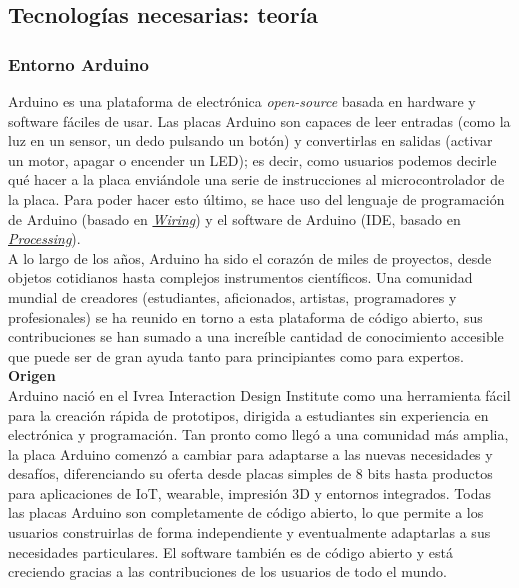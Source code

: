 \documentclass[12pt]{article}
\begin{document}
	
	\subsection[Tecnologías necesarias]{Tecnologías necesarias: teoría}
	\subsubsection[Entorno Arduino]{Entorno Arduino}
	
	
	Arduino es una plataforma de electrónica \textit{open-source} basada en hardware y software fáciles de usar. Las placas Arduino son capaces de leer entradas (como la luz en un sensor, un dedo pulsando un botón) y convertirlas en salidas (activar un motor, apagar o encender un LED); es decir, como usuarios podemos decirle qué hacer a la placa enviándole una serie de instrucciones al microcontrolador de la placa. Para poder hacer esto último, se hace uso del lenguaje de programación de Arduino (basado en \href{http://wiring.org.co/}{\textit{Wiring}}) y el software de Arduino (IDE, basado en \href{https://processing.org/}{\textit{Processing}}). \\
	
	\noindent A lo largo de los años, Arduino ha sido el corazón de miles de proyectos, desde objetos cotidianos hasta complejos instrumentos científicos. Una comunidad mundial de creadores (estudiantes, aficionados, artistas, programadores y profesionales) se ha reunido en torno a esta plataforma de código abierto, sus contribuciones se han sumado a una increíble cantidad de conocimiento accesible que puede ser de gran ayuda tanto para principiantes como para expertos. \\
	
	\noindent  \textbf{\large Origen} \\ 
	
	\noindent Arduino nació en el Ivrea Interaction Design Institute como una herramienta fácil para la creación rápida de prototipos, dirigida a estudiantes sin experiencia en electrónica y programación. Tan pronto como llegó a una comunidad más amplia, la placa Arduino comenzó a cambiar para adaptarse a las nuevas necesidades y desafíos, diferenciando su oferta desde placas simples de 8 bits hasta productos para aplicaciones de IoT, wearable, impresión 3D y entornos integrados. Todas las placas Arduino son completamente de código abierto, lo que permite a los usuarios construirlas de forma independiente y eventualmente adaptarlas a sus necesidades particulares. El software también es de código abierto y está creciendo gracias a las contribuciones de los usuarios de todo el mundo. \\
\end{document}
